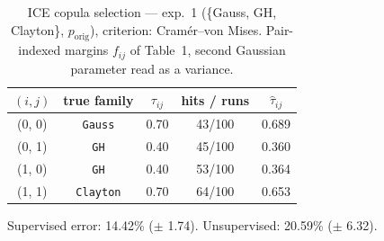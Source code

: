 \begin{table}[htbp]
  \centering
  \caption{ICE copula selection — exp.\ 1 (\{Gauss, GH, Clayton\}, $p_{\text{orig}}$), criterion: Cram\'er--von Mises. Pair-indexed margins $f_{ij}$ of Table~1, second Gaussian parameter read as a variance.}
  \label{tab:exp3-exp1_orig_p__cvm}
  \begin{tabular}{ccccc}
    \toprule
    $(i, j)$ & true family & $\tau_{ij}$ & hits / runs & $\hat\tau_{ij}$ \\
    \midrule
    (0, 0) & \texttt{Gauss} & 0.70 & 43/100 & 0.689 \\
    (0, 1) & \texttt{GH} & 0.40 & 45/100 & 0.360 \\
    (1, 0) & \texttt{GH} & 0.40 & 53/100 & 0.364 \\
    (1, 1) & \texttt{Clayton} & 0.70 & 64/100 & 0.653 \\
    \bottomrule
  \end{tabular}
  \par\smallskip Supervised error: 14.42\% ($\pm$ 1.74). Unsupervised: 20.59\% ($\pm$ 6.32).
\end{table}
